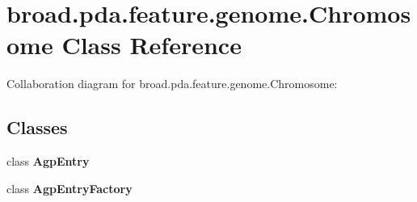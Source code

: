 \hypertarget{classbroad_1_1pda_1_1feature_1_1genome_1_1_chromosome}{\section{broad.\+pda.\+feature.\+genome.\+Chromosome Class Reference}
\label{classbroad_1_1pda_1_1feature_1_1genome_1_1_chromosome}
}


Collaboration diagram for broad.\+pda.\+feature.\+genome.\+Chromosome\+:
\subsection*{Classes}
\begin{DoxyCompactItemize}
\item 
class {\bfseries Agp\+Entry}
\item 
class {\bfseries Agp\+Entry\+Factory}
\end{DoxyCompactItemize}
